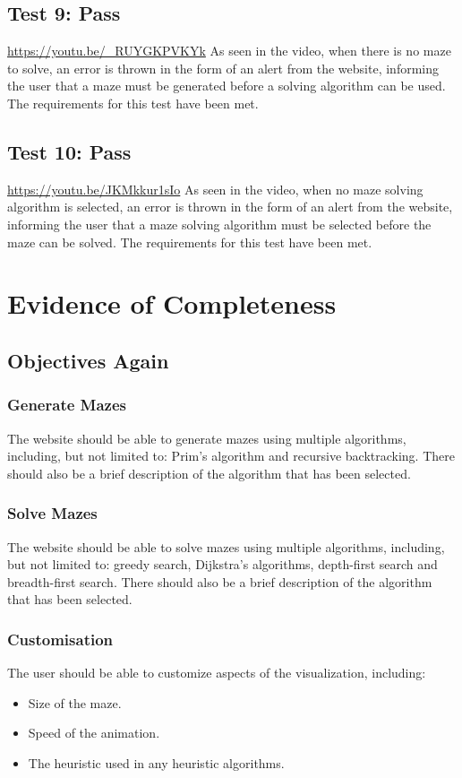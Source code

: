 \documentclass[titlepage]{article}
\begin{document}
\subsection{Test 9: Pass}
\url{https://youtu.be/_RUYGKPVKYk}
As seen in the video, when there is no maze to solve, an error is thrown in the form of an alert from the website, informing the user that a maze must be generated before a solving algorithm can be used. The requirements for this test have been met.

\subsection{Test 10: Pass}
\url{https://youtu.be/JKMkkur1sIo}
As seen in the video, when no maze solving algorithm is selected, an error is thrown in the form of an alert from the website, informing the user that a maze solving algorithm must be selected before the maze can be solved. The requirements for this test have been met.
\newpage
\section{Evidence of Completeness}  
\subsection{Objectives Again}
\subsubsection{Generate Mazes}
The website should be able to generate mazes using multiple algorithms, including, but not limited to: Prim's algorithm and recursive backtracking. There should also be a brief description of the algorithm that has been selected.

\subsubsection{Solve Mazes}
The website should be able to solve mazes using multiple algorithms, including, but not limited to: greedy search, Dijkstra's algorithms, depth-first search and breadth-first search. There should also be a brief description of the algorithm that has been selected.

\subsubsection{Customisation}
The user should be able to customize aspects of the visualization, including:
\begin{itemize}
    \item Size of the maze.
    \item Speed of the animation.
    \item The heuristic used in any heuristic algorithms.
\end{itemize}
\end{document}

